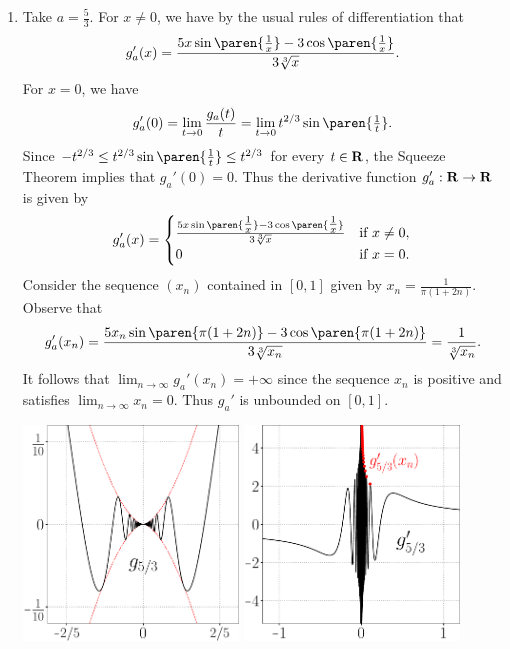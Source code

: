 \documentclass{lew98_solutions}
\begin{document}
\begin{solution}
    \begin{enumerate}
        \item Take \( a = \tfrac{5}{3} \). For \( x \neq 0 \), we have by the usual rules of differentiation that
        \[
            g_a'(x) = \frac{5 x \sin \paren{\tfrac{1}{x}} - 3 \cos \paren{\tfrac{1}{x}}}{3 \sqrt[3]{x}}.
        \]
        For \( x = 0 \), we have
        \[
            g_a'(0) = \lim_{t \to 0} \frac{g_a(t)}{t} = \lim_{t \to 0} t^{2/3} \sin \paren{\tfrac{1}{t}}. 
        \]
        Since \( -t^{2/3} \leq t^{2/3} \sin \paren{\tfrac{1}{t}} \leq t^{2/3} \) for every \( t \in \mathbf{R} \), the Squeeze Theorem implies that \( g_a'(0) = 0 \). Thus the derivative function \( g_a' : \mathbf{R} \to \mathbf{R} \) is given by
        \[
            g_a'(x) = \begin{cases}
                \frac{5 x \sin \paren{\tfrac{1}{x}} - 3 \cos \paren{\tfrac{1}{x}}}{3 \sqrt[3]{x}} & \text{if } x \neq 0, \\
                0 & \text{if } x = 0.
            \end{cases}
        \]
        Consider the sequence \( (x_n) \) contained in \( [0, 1] \) given by \( x_n = \tfrac{1}{\pi (1 + 2n)} \). Observe that
        \[
            g_a'(x_n) = \frac{5 x_n \sin \paren{\pi (1 + 2n)} - 3 \cos \paren{\pi (1 + 2n)}}{3 \sqrt[3]{x_n}} = \frac{1}{\sqrt[3]{x_n}}.
        \]
        It follows that \( \lim_{n \to \infty} g_a'(x_n) = +\infty \) since the sequence \( x_n \) is positive and satisfies \( \lim_{n \to \infty} x_n = 0 \). Thus \( g_a' \) is unbounded on \( [0, 1] \).
        \begin{center}
            \includegraphics[width=0.45\textwidth]{UA_Figures/UA_ex5_2_7_fig_1.pdf}
            \hspace{4mm}
            \includegraphics[width=0.45\textwidth]{UA_Figures/UA_ex5_2_7_fig_2.pdf}
        \end{center}


\end{enumerate}
\end{solution}
\end{document}
